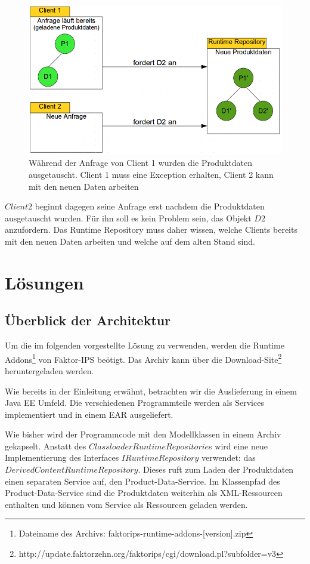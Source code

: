 \documentclass[headsepline=true, footsepline=true]{scrartcl}
\begin{document}
\begin{figure}[htb] \centering
\includegraphics[width=13cm]{./pics/concurrent_access.png} \caption{Während der
Anfrage von Client 1 wurden die Produktdaten ausgetauscht. Client 1 muss eine
Exception erhalten, Client 2 kann mit den neuen Daten arbeiten}
\label{concurrent_access}
\end{figure}

$Client 2$ beginnt dagegen seine Anfrage erst nachdem die Produktdaten
ausgetauscht wurden. Für ihn soll es kein Problem sein, das Objekt $D2$
anzufordern. Das Runtime Repository muss daher wissen, welche Clients bereits
mit den neuen Daten arbeiten und welche auf dem alten Stand sind.

\section{Lösungen}
\label{loesungen}

\subsection{Überblick der Architektur}

Um die im folgenden vorgestellte Lösung zu verwenden, werden
die Runtime Addons\footnote{Dateiname des Archivs:
faktorips-runtime-addons-[version].zip} von Faktor-IPS beötigt. Das Archiv kann
über die Download-Site\footnote{http://update.faktorzehn.org/faktorips/cgi/download.pl?subfolder=v3} heruntergeladen werden.

Wie bereits in der Einleitung erwähnt, betrachten wir die Auslieferung in einem
Java EE Umfeld. Die verschiedenen Programmteile werden als Services implementiert
und in einem EAR ausgeliefert.

Wie bisher wird der Programmcode mit den Modellklassen in einem Archiv gekapselt.
Anstatt des $ClassloaderRuntimeRepositorie$s wird eine neue Implementierung des
Interfaces $IRuntimeRepository$ verwendet: das
$DerivedContentRuntimeRepository$. Dieses ruft zum Laden der Produktdaten einen separaten Service auf, den
Product-Data-Service. Im Klassenpfad des Product-Data-Service sind die
Produktdaten weiterhin als XML-Ressourcen enthalten und können vom Service als
Ressourcen geladen werden.
\end{document}
